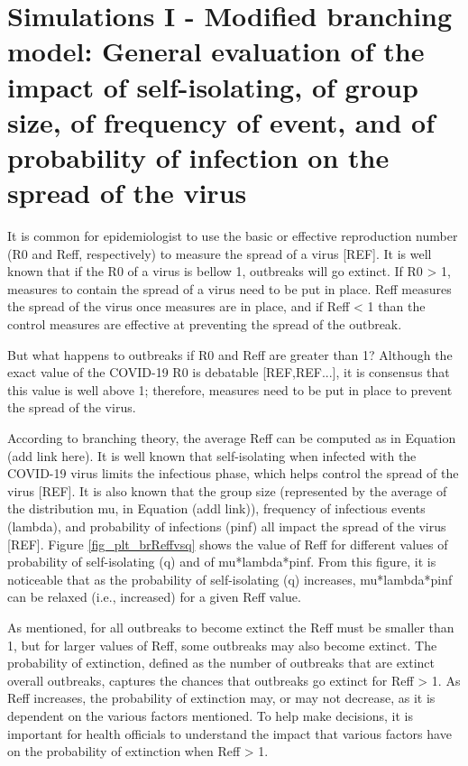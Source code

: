 \documentclass[sr]{drdc-report}
\begin{document}
\section{Simulations I - Modified branching model: General evaluation of the impact of self-isolating, of group size, of frequency of event, and of probability of infection on the spread of the virus}\label{section_ExpParams}

It is common for epidemiologist to use the basic or effective reproduction number (R0 and Reff, respectively) to measure the spread of a virus [REF]. It is well known that if the R0 of a virus is bellow 1, outbreaks will go extinct. If R0 > 1, measures to contain the spread of a virus need to be put in place. Reff measures the spread of the virus once measures are in place, and if Reff < 1 than the control measures are effective at preventing the spread of the outbreak. 

But what happens to outbreaks if R0 and Reff are greater than 1? Although the exact value of the COVID-19 R0 is debatable [REF,REF...], it is consensus that this value is well above 1; therefore, measures need to be put in place to prevent the spread of the virus. 

According to branching theory, the average Reff can be computed as in Equation (add link here). It is well known that self-isolating when infected with the COVID-19 virus limits the infectious phase, which helps control the spread of the virus [REF]. It is also known that the group size (represented by the average of the distribution mu, in Equation (addl link)), frequency of infectious events (lambda), and probability of infections (pinf) all impact the spread of the virus [REF]. Figure \ref{fig_plt_brReffvsq} shows the value of Reff for different values of probability of self-isolating (q) and of mu*lambda*pinf. From this figure, it is noticeable that as the probability of self-isolating (q) increases, mu*lambda*pinf can be relaxed (i.e., increased) for a given Reff value. 

As mentioned, for all outbreaks to become extinct the Reff must be smaller than 1, but for larger values of Reff, some outbreaks may also become extinct. The probability of extinction, defined as the number of outbreaks that are extinct overall outbreaks, captures the chances that outbreaks go extinct for Reff > 1. As Reff increases, the probability of extinction may, or may not decrease, as it is dependent on the various factors mentioned. To help make decisions, it is important for health officials to understand the impact that various factors have on the probability of extinction when Reff > 1. 
\end{document}
